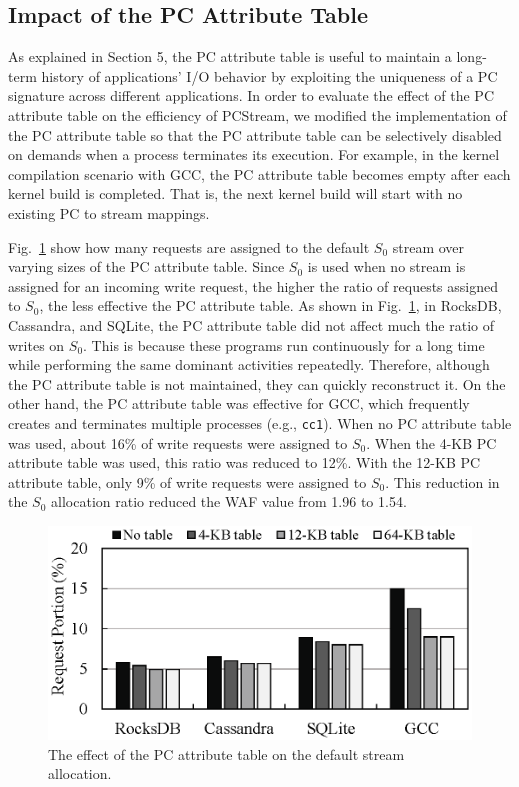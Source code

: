 \vspace{-10pt}
\subsection{Impact of the PC Attribute Table}
\vspace{-5pt}
As explained in Section 5, the PC attribute table is useful to maintain a 
long-term history of applications' I/O behavior by exploiting the  
uniqueness of a PC signature across different applications.   
In order to evaluate the effect of the PC
attribute table on the efficiency of \textsf{\small PCStream}, we modified the 
implementation of the PC attribute table so that the PC attribute table can be 
selectively disabled on demands when a process terminates its execution.  
For example, in the kernel compilation scenario with GCC, the PC attribute table 
becomes empty after each kernel build is completed.
That is, the next kernel build will start with no existing PC to stream mappings.


Fig.~\ref{fig:pctable} show how many requests are assigned to the 
default $S_{0}$ stream over varying sizes of the PC attribute table. 
Since $S_{0}$ is used when no stream is assigned for an incoming
write request, the higher the ratio of requests assigned to $S_{0}$, 
the less effective the PC attribute table.   
As shown in Fig.~\ref{fig:pctable}, in RocksDB, Cassandra, and SQLite, 
the PC attribute table did not affect much the ratio of writes on $S_{0}$. 
This is because these
programs run continuously for a long time while performing the same dominant activities repeatedly.  
Therefore, although the PC attribute table is not maintained, they can quickly reconstruct it.
On the other hand, the PC attribute table was effective for GCC, 
which frequently creates and terminates multiple processes (e.g., {\tt cc1}).  
When no PC attribute table was used, about 16\% of write requests were assigned to $S_{0}$.  
When the 4-KB PC attribute table was used, this ratio was reduced to 12\%.  
With the 12-KB PC attribute table, only 9\% of write requests were assigned to $S_{0}$.  
This reduction in the $S_{0}$ allocation ratio reduced the WAF value from 1.96 to 1.54.
\begin{figure}[t]
	\centering
	\includegraphics[width=0.7\linewidth]{figure/pctable}
	\caption{The effect of the PC attribute table on the default stream allocation.}
	\label{fig:pctable}
	\vspace{-20pt}
\end{figure}


